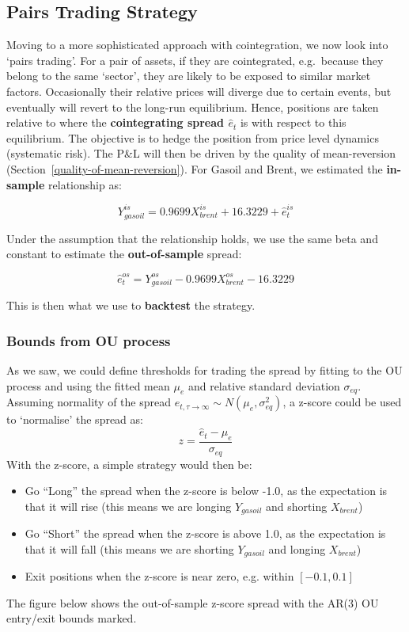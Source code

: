 \documentclass[11pt]{article}
\begin{document}
    \subsection{Pairs Trading Strategy}\label{pairs-trading-strategy}
    
    Moving to a more sophisticated approach with cointegration, we now look into  `pairs
trading'. 
For a pair of  assets, if they are cointegrated, e.g.~because they belong
to the same `sector', they are likely to be exposed to similar market
factors. Occasionally their relative prices will diverge due to certain
events, but eventually will revert to the long-run equilibrium. Hence,
positions are taken relative to where the \textbf{cointegrating spread
\(\hat{e}_t\)} is with respect to this equilibrium. The objective
is to hedge the position from price level dynamics (systematic risk). The
P\&L  will then be driven by the quality of mean-reversion (Section~\ref{quality-of-mean-reversion}).
For Gasoil and Brent, we estimated the \textbf{in-sample} 
relationship as:

\begin{equation}
Y_{gasoil}^{is} = 0.9699 X_{brent}^{is}  + 16.3229 + \hat{e}_t^{is}
\end{equation}

Under the assumption that the relationship holds, we use the same beta
and constant to estimate the \textbf{out-of-sample} spread:

\begin{equation}
\hat{e}_t^{os} = Y_{gasoil}^{os} - 0.9699 X_{brent}^{os}  - 16.3229 
\end{equation}

This is then what we use to \textbf{backtest} the strategy.
    \subsubsection{Bounds from OU process}\label{bounds-from-ou-process}
As we saw, we could define thresholds for trading the spread by fitting
to the OU process and using the fitted mean \(\mu_e\) and relative
standard deviation \(\sigma_{eq}\). Assuming normality of the spread
\(e_{t, \tau \to \infty} \sim N (\mu_e, \sigma^2_{eq})\), a z-score
could be used to `normalise' the spread as:
\begin{equation}
z = \frac{\hat{e}_t - \mu_e}{\sigma_{eq}}
\end{equation}
With the z-score, a simple strategy would then be:
\begin{itemize}
\item
  Go ``Long'' the spread when the z-score is below -1.0, as the expectation is that it will rise (this means we are  longing \(Y_{gasoil}\) and shorting \(X_{brent}\))
\item
  Go ``Short'' the spread when the z-score is above 1.0, as the expectation is that it will fall (this means we are  shorting \(Y_{gasoil}\) and longing \(X_{brent}\))
\item
  Exit positions when the z-score is near zero, e.g. within \([-0.1, 0.1]\)
 
\end{itemize}
The figure  below shows the out-of-sample z-score spread with the AR(3)
OU entry/exit bounds marked.
\end{document}
